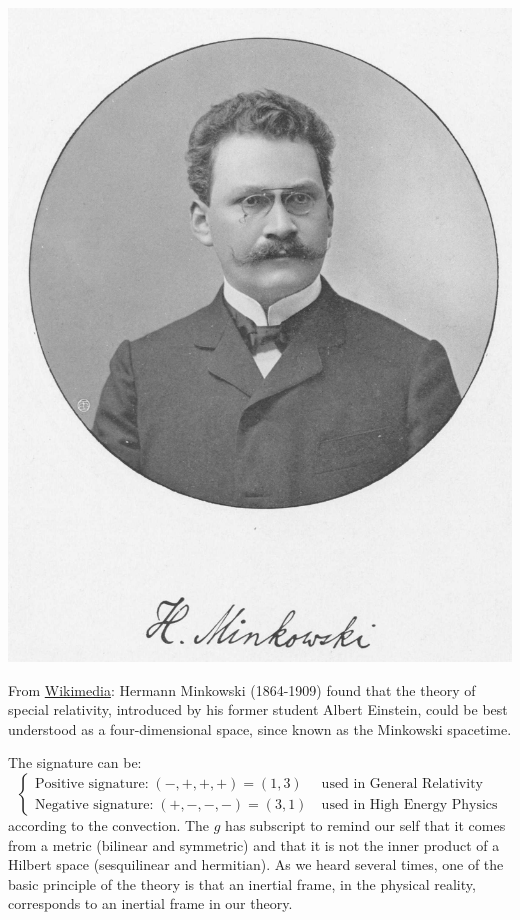 \documentclass[../main.tex]{subfiles}
\begin{document}
\begin{marginfigure}
	\includegraphics[width=1\linewidth]{images/De_Raum_zeit_Minkowski_Bild.jpg}
	\caption[Photo of Minkowski]{From \href{https://commons.wikimedia.org/wiki/File:De_Raum_zeit_Minkowski_Bild.jpg}{Wikimedia}: Hermann Minkowski (1864-1909) found that the theory of special relativity, introduced by his former student Albert Einstein, could be best understood as a four-dimensional space, since known as the Minkowski spacetime.}
\end{marginfigure}
The signature can be:
\[
\begin{cases}
    \textrm{Positive signature:}\;(-,+,+,+)=(1,3) \;\; &\textrm{used in General Relativity}\\
    \textrm{Negative signature:}\;(+,-,-,-)=(3,1) &\textrm{used in High Energy Physics}
\end{cases}
\]
according to the convection. The $g$ has subscript to remind our self that it comes from a metric (bilinear and symmetric) and that it is not the inner product of a Hilbert space (sesquilinear and hermitian). As we heard several times, one of the basic principle of the theory is that an inertial frame, in the physical reality, corresponds to an inertial frame in our theory.
\end{document}
